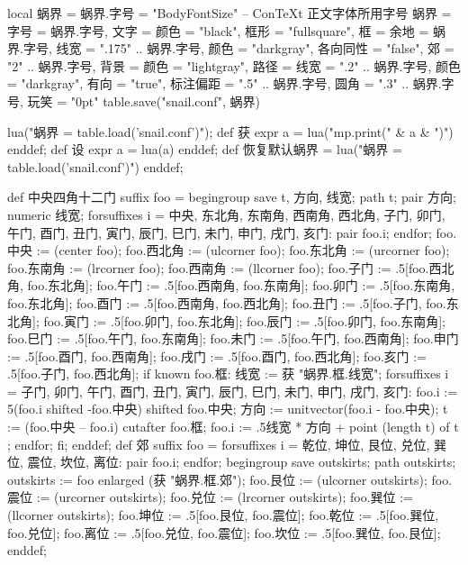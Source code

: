 \startluacode
local 蜗界 = {}
蜗界.字号 = "BodyFontSize" -- ConTeXt 正文字体所用字号
蜗界 = {
    字号 = 蜗界.字号,
    文字 = {颜色 = "black"},
    框形 = "fullsquare",
    框 = {余地 = 蜗界.字号,
          线宽 = ".175" .. 蜗界.字号,
          颜色 = "darkgray",
          各向同性 = "false",
          郊 = "2" .. 蜗界.字号},
    背景 = {颜色 = "lightgray"},
    路径 = {线宽 = ".2" .. 蜗界.字号,
            颜色 = "darkgray",
            有向 = "true",
            标注偏距 = ".5" .. 蜗界.字号,
            圆角 = ".3" .. 蜗界.字号},
    玩笑 = "0pt"
}
table.save("snail.conf", 蜗界)
\stopluacode

\startMPinclusions
lua("蜗界 = table.load('snail.conf')");
def 获 expr a = lua("mp.print(" & a & ")") enddef;
def 设 expr a = lua(a) enddef;
def 恢复默认蜗界 =
  lua("蜗界 = table.load('snail.conf')")
enddef;
\stopMPinclusions

\startMPinclusions[+]
def 中央四角十二门 suffix foo = 
  begingroup
  save t, 方向, 线宽; path t; pair 方向; numeric 线宽;
  forsuffixes i = 中央, 东北角, 东南角, 西南角, 西北角,
                  子门, 卯门, 午门, 酉门,
                  丑门, 寅门, 辰门, 巳门, 未门, 申门, 戌门, 亥门:
    pair foo.i;
  endfor;
  foo.中央 := (center foo);
  foo.西北角 := (ulcorner foo); 
  foo.东北角 := (urcorner foo);
  foo.东南角 := (lrcorner foo);
  foo.西南角 := (llcorner foo);
  foo.子门 := .5[foo.西北角, foo.东北角];
  foo.午门 := .5[foo.西南角, foo.东南角];
  foo.卯门 := .5[foo.东南角, foo.东北角];
  foo.酉门 := .5[foo.西南角, foo.西北角];
  foo.丑门 := .5[foo.子门, foo.东北角];
  foo.寅门 := .5[foo.卯门, foo.东北角];
  foo.辰门 := .5[foo.卯门, foo.东南角];
  foo.巳门 := .5[foo.午门, foo.东南角];
  foo.未门 := .5[foo.午门, foo.西南角];
  foo.申门 := .5[foo.酉门, foo.西南角];
  foo.戌门 := .5[foo.酉门, foo.西北角];
  foo.亥门 := .5[foo.子门, foo.西北角];
  if known foo.框:
    线宽 := 获 "蜗界.框.线宽";
    forsuffixes i = 子门, 卯门, 午门, 酉门,
                    丑门, 寅门, 辰门, 巳门, 未门, 申门, 戌门, 亥门:
      foo.i := 5(foo.i shifted -foo.中央) shifted foo.中央;
      方向 := unitvector(foo.i - foo.中央);
      t := (foo.中央 -- foo.i) cutafter foo.框;
      foo.i := .5线宽 * 方向 + point (length t) of t ;
    endfor;
  fi;
enddef;
def 郊 suffix foo = 
  forsuffixes i = 乾位, 坤位, 艮位, 兑位, 巽位, 震位, 坎位, 离位:
    pair foo.i;
  endfor;
  begingroup
    save outskirts; path outskirts;
  outskirts := foo enlarged (获 "蜗界.框.郊");
  foo.艮位 := (ulcorner outskirts); 
  foo.震位 := (urcorner outskirts);
  foo.兑位 := (lrcorner outskirts);
  foo.巽位 := (llcorner outskirts);
  foo.坤位 := .5[foo.艮位, foo.震位];
  foo.乾位 := .5[foo.巽位, foo.兑位];
  foo.离位 := .5[foo.兑位, foo.震位];
  foo.坎位 := .5[foo.巽位, foo.艮位];
enddef;

